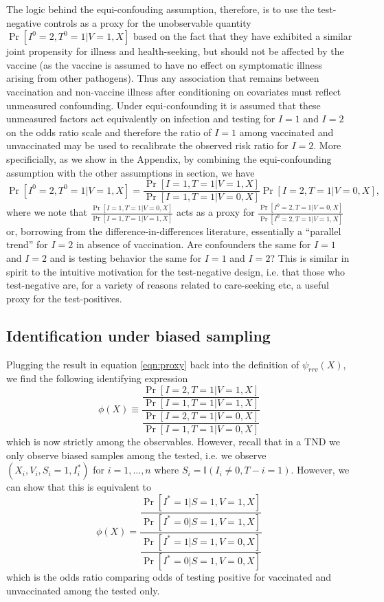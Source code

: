 \documentclass[11pt]{article}
\begin{document}
The logic behind the equi-confouding assumption, therefore, is to use the test-negative controls as a proxy for the unobservable quantity $\Pr[I^0 = 2, T^0 = 1 | V = 1, X]$ based on the fact that they have exhibited a similar joint propensity for illness and health-seeking, but should not be affected by the vaccine (as the vaccine is assumed to have no effect on symptomatic illness arising from other pathogens). Thus any association that remains between vaccination and non-vaccine illness after conditioning on covariates must reflect unmeasured confounding. Under equi-confounding it is assumed that these unmeasured factors act equivalently on infection and testing for $I=1$ and $I=2$ on the odds ratio scale and therefore the ratio of $I=1$ among vaccinated and unvaccinated may be used to recalibrate the observed risk ratio for $I = 2$. More specificially, as we show in the Appendix, by combining the equi-confounding assumption with the other assumptions in section, we have
    \begin{equation}\label{eqn:proxy}
     \Pr[I^0 = 2, T^0 = 1  | V = 1, X] = \frac{\Pr[I = 1, T = 1  | V = 1, X]}{\Pr[I = 1, T = 1  | V = 0, X]}\Pr[I = 2, T = 1 | V = 0, X],
    \end{equation}
where we note that $\frac{\Pr[I = 1, T =1  | V = 0, X]}{\Pr[I = 1, T = 1 | V = 1, X]}$ acts as a proxy for $\frac{\Pr[I^0 = 2, T =1  | V = 0, X]}{\Pr[I^0 = 2, T = 1 | V = 1, X]}$ or, borrowing from the difference-in-differences literature, essentially a ``parallel trend'' for $I=2$ in absence of vaccination. Are confounders the same for $I=1$ and $I=2$ and is testing behavior the same for $I=1$ and $I=2$? This is similar in spirit to the intuitive motivation for the test-negative design, i.e. that those who test-negative are, for a variety of reasons related to care-seeking etc, a useful proxy for the test-positives.

\subsection{Identification under biased sampling}
Plugging the result in equation \ref{eqn:proxy} back into the definition of $\psi_{rrv}(X)$, we find the following identifying expression 
    \begin{equation*}
         \phi(X) \equiv \dfrac{\dfrac{\Pr[I = 2, T = 1 | V = 1, X]}{\Pr[I = 1, T = 1 | V = 1, X]}}{\dfrac{\Pr[I = 2, T = 1 | V = 0, X]}{\Pr[I = 1, T = 1 | V = 0, X]}}
    \end{equation*}
which is now strictly among the observables. However, recall that in a TND we only observe biased samples among the tested, i.e. we observe $(X_i, V_i, S_i = 1, I^*_i)$ for $i = 1, \ldots, n$ where $S_i = \mathbb{I}(I_i \neq 0, T-i = 1)$. However, we can show that this is equivalent to 
    \begin{equation}
         \phi(X) = \dfrac{\dfrac{\Pr[I^* = 1 | S = 1, V = 1, X]}{\Pr[I^* = 0 | S = 1, V = 1, X]}}{\dfrac{\Pr[I^* = 1 | S = 1, V = 0, X]}{\Pr[I^* = 0 | S = 1, V = 0, X]}}
    \end{equation}    
which is the odds ratio comparing odds of testing positive for vaccinated and unvaccinated among the tested only.
\end{document}
